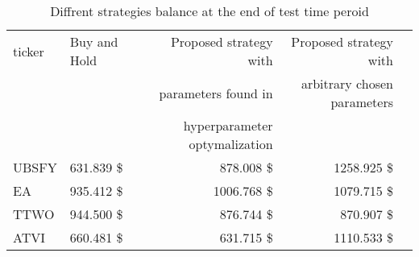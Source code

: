 \documentclass[11pt]{article} %
\begin{document}
\begin{table}[H]
\centering
\caption{Diffrent strategies balance at the end of test time peroid}
\begin{tabular}{llrrr}
\toprule
 ticker &  Buy and Hold &  Proposed strategy with  &  Proposed strategy with  \\
  &        &                                        parameters found in  &                                           arbitrary chosen parameters \\
  &        &                                         hyperparameter optymalization &                                            \\

 \midrule
  UBSFY &       631.839 \$&                                            878.008 \$ &                                           1258.925 \$\\
    EA &       935.412 \$&                                           1006.768 \$&                                           1079.715 \$\\
   TTWO &       944.500 \$&                                            876.744 \$&                                            870.907 \$\\
   ATVI &       660.481 \$&                                            631.715 \$&                                           1110.533 \$\\
\bottomrule
\end{tabular}
\end{table}



\begin{figure}[H]
\begin{adjustbox}{width=1.3\textwidth,center}

\end{adjustbox}
\end{figure}

\begin{figure}[H]
\begin{adjustbox}{width=1.3\textwidth,center}

\end{adjustbox}
\end{figure}

\begin{figure}[H]
\begin{adjustbox}{width=1.3\textwidth,center}

\end{adjustbox}
\end{figure}
\end{document}
